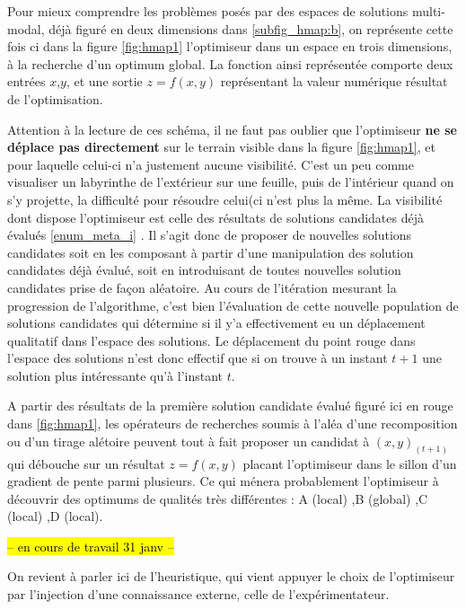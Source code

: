 Pour mieux comprendre les problèmes posés par des espaces de solutions multi-modal, déjà figuré en deux dimensions dans \ref{subfig_hmap:b}, on représente cette fois ci dans la figure \ref{fig:hmap1} l'optimiseur dans un espace en trois dimensions, à la recherche d'un optimum global. La fonction ainsi représentée comporte deux entrées $x$,$y$, et une sortie $z = f(x,y)$ représentant la valeur numérique résultat de l'optimisation.

Attention à la lecture de ces schéma, il ne faut pas oublier que l'optimiseur \textbf{ne se déplace pas directement} sur le terrain visible dans la figure \ref{fig:hmap1}, et pour laquelle celui-ci n'a justement aucune visibilité. C'est un peu comme visualiser un labyrinthe de l'extérieur sur une feuille, puis de l'intérieur quand on s'y projette, la difficulté pour résoudre celui(ci n'est plus la même. La visibilité dont dispose l'optimiseur est celle des résultats de solutions candidates déjà évalués \ref{enum_meta_i} . Il s'agit donc de proposer de nouvelles solutions candidates soit en les composant à partir d'une manipulation des solution candidates déjà évalué, soit en introduisant de toutes nouvelles solution candidates prise de façon aléatoire. Au cours de l'itération mesurant la progression de l'algorithme, c'est bien l'évaluation de cette nouvelle population de solutions candidates qui détermine si il y'a effectivement eu un déplacement qualitatif dans l'espace des solutions. Le déplacement du point rouge dans l'espace des solutions n'est donc effectif que si on trouve à un instant $t + 1$ une solution plus intéressante qu'à l'instant $t$.

A partir des résultats de la première solution candidate évalué figuré ici en rouge dans \ref{fig:hmap1}, les opérateurs de recherches soumis à l'aléa d'une recomposition ou d'un tirage alétoire peuvent tout à fait proposer un candidat à $(x,y)_(t+1)$ qui débouche sur un résultat $z = f(x,y)$ placant l'optimiseur dans le sillon d'un gradient de pente parmi plusieurs. Ce qui ménera probablement l'optimiseur à découvrir des optimums de qualités très différentes : A (local) ,B (global) ,C (local) ,D (local). 

\hl{-- en cours de travail 31 janv --}

On revient à parler ici de l'heuristique, qui vient appuyer le choix de l'optimiseur par l'injection d'une connaissance externe, celle de l'expérimentateur.

